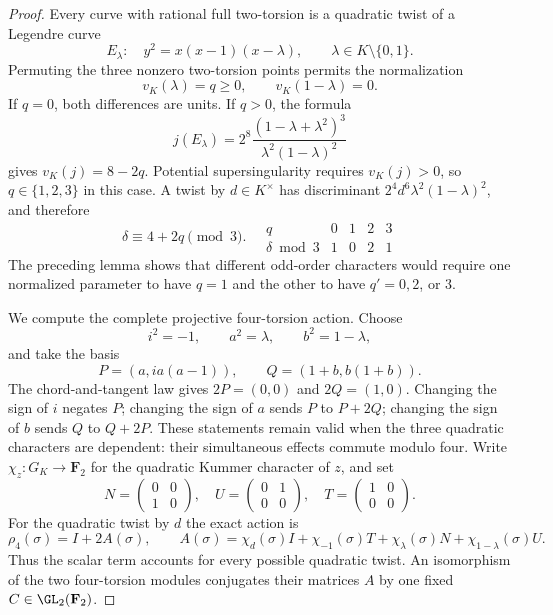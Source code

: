 \begin{proof}
Every curve with rational full two-torsion is a quadratic twist
of a Legendre curve
\[
              E_\lambda:\quad y^2=x(x-1)(x-\lambda),
              \qquad \lambda\in K\setminus\{0,1\}.
\]
Permuting the three nonzero two-torsion points permits the
normalization
\[
 v_K(\lambda)=q\ge0,\qquad v_K(1-\lambda)=0.
                                                               \tag{B-RD46.2}
\]
If $q=0$, both differences are units. If $q>0$, the formula
\[
 j(E_\lambda)=2^8\frac{(1-\lambda+\lambda^2)^3}
                         {\lambda^2(1-\lambda)^2}
\]
gives $v_K(j)=8-2q$. Potential supersingularity requires
$v_K(j)>0$, so $q\in\{1,2,3\}$ in this case.
A twist by $d\in K^\times$ has discriminant
$2^4d^6\lambda^2(1-\lambda)^2$, and therefore
\[
 \delta\equiv4+2q\pmod3.
 \quad
 \begin{array}{c|rrrr}
 q&0&1&2&3\\\hline
 \delta\bmod3&1&0&2&1
 \end{array}                                             \tag{B-RD46.3}
\]
The preceding lemma shows that different odd-order characters
would require one normalized parameter to have $q=1$ and the
other to have $q'=0,2$, or $3$.

We compute the complete projective four-torsion action. Choose
\[
 i^2=-1,\qquad a^2=\lambda,\qquad b^2=1-\lambda,
\]
and take the basis
\[
 P=(a,ia(a-1)),\qquad Q=(1+b,b(1+b)).
                                                               \tag{B-RD46.4}
\]
The chord-and-tangent law gives
$2P=(0,0)$ and $2Q=(1,0)$.
Changing the sign of $i$ negates $P$; changing the sign of $a$
sends $P$ to $P+2Q$; changing the sign of $b$ sends $Q$ to
$Q+2P$. These statements remain valid when the three quadratic
characters are dependent: their simultaneous effects commute
modulo four. Write $\chi_z:G_K\to\mathbf F_2$ for the
quadratic Kummer character of $z$, and set
\[
 N=\begin{pmatrix}0&0\\1&0\end{pmatrix},\quad
 U=\begin{pmatrix}0&1\\0&0\end{pmatrix},\quad
 T=\begin{pmatrix}1&0\\0&0\end{pmatrix}.
\]
For the quadratic twist by $d$ the exact action is
\[
 \rho_4(\sigma)=I+2A(\sigma),\qquad
 A(\sigma)=\chi_d(\sigma)I+\chi_{-1}(\sigma)T
             +\chi_\lambda(\sigma)N
             +\chi_{1-\lambda}(\sigma)U.              \tag{B-RD46.5}
\]
Thus the scalar term accounts for every possible quadratic twist.
An isomorphism of the two four-torsion modules conjugates their
matrices $A$ by one fixed $C\in\GL_2(\mathbf F_2)$.


\end{proof}
